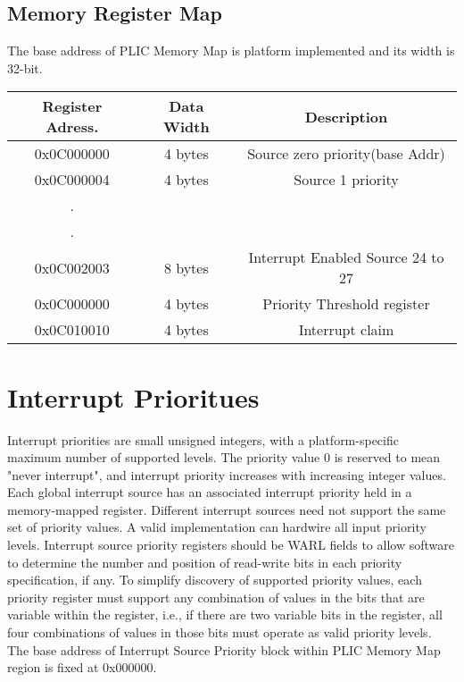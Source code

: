 \subsection{Memory Register Map}
The base address of PLIC Memory Map is platform implemented and its width is 32-bit.
\begin{center}
\label{tabel:reg_map}
\begin{tabular}{|c|c|c|} 
 \hline
Register Adress. & Data Width & Description \\ [0.5ex] 
 \hline
 0x0C000000 & 4 bytes & Source zero priority(base Addr) \\ [1ex]
 \hline
 0x0C000004 & 4 bytes & Source 1 priority \\ [1ex]
 \hline
.\\[0.2ex]
.\\[0.2ex]

\hline
 0x0C002003 & 8 bytes & Interrupt Enabled Source 24 to 27 \\ [1ex]
 \hline
 0x0C000000 & 4 bytes & Priority Threshold register \\ [1ex]
 \hline
 0x0C010010 & 4 bytes & Interrupt claim \\ [1ex]
\hline
\end{tabular}

\end{center}

\section{Interrupt Prioritues}
Interrupt priorities are small unsigned integers, with a platform-specific maximum number of supported levels. The priority value 0 is reserved to mean "never interrupt", and interrupt priority increases with increasing integer values. Each global interrupt source has an associated interrupt priority held in a memory-mapped register. Different interrupt sources need not support the same set of priority values. A valid implementation can hardwire all input priority levels. Interrupt source priority registers should be WARL fields to allow software to determine the number and position of read-write bits in each priority specification, if any. To simplify discovery of supported priority values, each priority register must support any combination of values in the bits that are variable within the register, i.e., if there are two variable bits in the register, all four combinations of values in those bits must operate as valid priority levels. The base address of Interrupt Source Priority block within PLIC Memory Map region is fixed at
0x000000.

